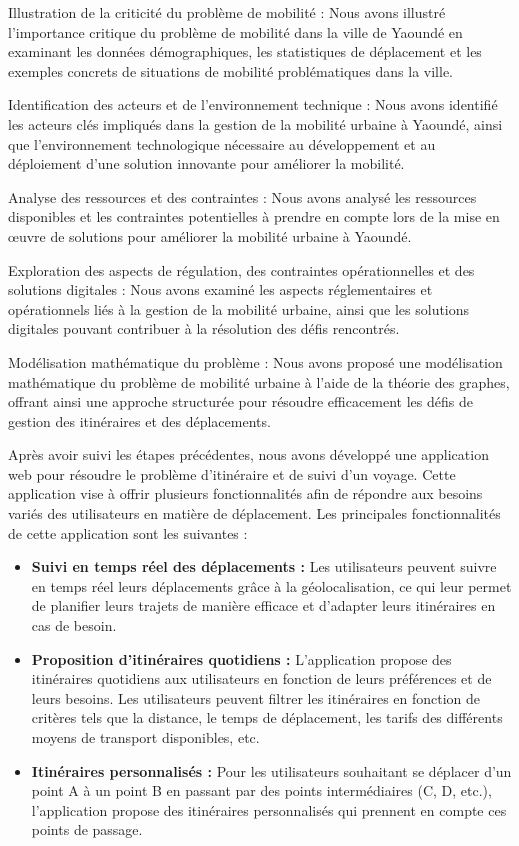 \documentclass{article}
\begin{document}
Illustration de la criticité du problème de mobilité :
Nous avons illustré l'importance critique du problème de mobilité dans la ville de Yaoundé en examinant les données démographiques, les statistiques de déplacement et les exemples concrets de situations de mobilité problématiques dans la ville.

Identification des acteurs et de l'environnement technique :
Nous avons identifié les acteurs clés impliqués dans la gestion de la mobilité urbaine à Yaoundé, ainsi que l'environnement technologique nécessaire au développement et au déploiement d'une solution innovante pour améliorer la mobilité.

Analyse des ressources et des contraintes :
Nous avons analysé les ressources disponibles et les contraintes potentielles à prendre en compte lors de la mise en œuvre de solutions pour améliorer la mobilité urbaine à Yaoundé.

Exploration des aspects de régulation, des contraintes opérationnelles et des solutions digitales :
Nous avons examiné les aspects réglementaires et opérationnels liés à la gestion de la mobilité urbaine, ainsi que les solutions digitales pouvant contribuer à la résolution des défis rencontrés.

Modélisation mathématique du problème :
Nous avons proposé une modélisation mathématique du problème de mobilité urbaine à l'aide de la théorie des graphes, offrant ainsi une approche structurée pour résoudre efficacement les défis de gestion des itinéraires et des déplacements.

Après avoir suivi les étapes précédentes, nous avons développé une application web pour résoudre le problème d'itinéraire et de suivi d'un voyage. Cette application vise à offrir plusieurs fonctionnalités afin de répondre aux besoins variés des utilisateurs en matière de déplacement. Les principales fonctionnalités de cette application sont les suivantes :

\begin{itemize}
    \item \textbf{Suivi en temps réel des déplacements :} Les utilisateurs peuvent suivre en temps réel leurs déplacements grâce à la géolocalisation, ce qui leur permet de planifier leurs trajets de manière efficace et d'adapter leurs itinéraires en cas de besoin.
    
    \item \textbf{Proposition d'itinéraires quotidiens :} L'application propose des itinéraires quotidiens aux utilisateurs en fonction de leurs préférences et de leurs besoins. Les utilisateurs peuvent filtrer les itinéraires en fonction de critères tels que la distance, le temps de déplacement, les tarifs des différents moyens de transport disponibles, etc.
    
    \item \textbf{Itinéraires personnalisés :} Pour les utilisateurs souhaitant se déplacer d'un point A à un point B en passant par des points intermédiaires (C, D, etc.), l'application propose des itinéraires personnalisés qui prennent en compte ces points de passage.
\end{itemize}
\end{document}
